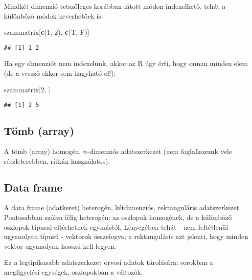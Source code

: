 \documentclass[
]{book}
\newenvironment{Shaded}{\begin{snugshade}}{\end{snugshade}}
\newcommand{\DecValTok}[1]{\textcolor[rgb]{0.00,0.00,0.81}{#1}}
\newcommand{\KeywordTok}[1]{\textcolor[rgb]{0.13,0.29,0.53}{\textbf{#1}}}
\newcommand{\NormalTok}[1]{#1}
\begin{document}
Mindkét dimenzió tetszőleges korábban látott módon indexelhető, tehát a különböző módok keverhetőek is:

\begin{Shaded}
\begin{Highlighting}[]
\NormalTok{szammatrix[}\KeywordTok{c}\NormalTok{(}\DecValTok{1}\NormalTok{, }\DecValTok{2}\NormalTok{), }\KeywordTok{c}\NormalTok{(T, F)]}
\end{Highlighting}
\end{Shaded}

\begin{verbatim}
## [1] 1 2
\end{verbatim}

Ha egy dimenziót nem indexelünk, akkor az R úgy érti, hogy onnan minden elem (de a vessző ekkor sem hagyható el!):

\begin{Shaded}
\begin{Highlighting}[]
\NormalTok{szammatrix[}\DecValTok{2}\NormalTok{, ]}
\end{Highlighting}
\end{Shaded}

\begin{verbatim}
## [1] 2 5
\end{verbatim}

\hypertarget{tuxf6mb-array}{%
\subsection{Tömb (array)}\label{tuxf6mb-array}}

A tömb (array) homogén, \(n\)-dimenziós adatszerkezet (nem foglalkozunk vele részletesebben, ritkán használatos).

\hypertarget{data-frame}{%
\subsection{Data frame}\label{data-frame}}

A data frame (adatkeret) heterogén, kétdimenziós, rektanguláris adatszerkezet. Pontosabban szólva félig heterogén: az oszlopok homogének, de a különböző oszlopok típusai eltérhetnek egymástól. Lényegében tehát - nem feltétlenül ugyanolyan típusú - vektorok összefogva; a rektanguláris azt jelenti, hogy minden vektor ugyanolyan hosszú kell legyen.

Ez a legtipikusabb adatszerkezet orvosi adatok tárolására: sorokban a megfigyelési egységek, oszlopokban a változók.
\end{document}
